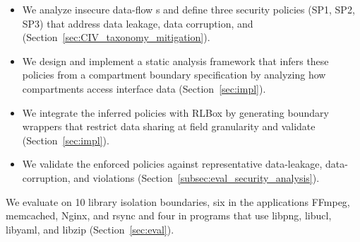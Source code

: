 \begin{itemize}
    \item We analyze insecure data-flow \vulName{}s and
    define three security policies (SP1, SP2, SP3) that address data
    leakage, data corruption, and 
    (Section~\ref{sec:CIV_taxonomy_mitigation}).

    \item We design and implement a static analysis framework that
    infers these policies from a compartment boundary specification by analyzing how  compartments access interface data (Section~\ref{sec:impl}).

    \item We integrate the inferred policies with RLBox by generating
    boundary wrappers that restrict data sharing at field granularity and validate  (Section~\ref{sec:impl}).

    \item We validate the enforced policies against representative
    data-leakage, data-corruption, and  violations
    (Section~\ref{subsec:eval_security_analysis}).
\end{itemize}

We evaluate \sysName{} on 10 library isolation boundaries, six in the
applications FFmpeg, memcached, Nginx, and rsync and four in programs that use
libpng, libucl, libyaml, and libzip (Section~\ref{sec:eval}). 
